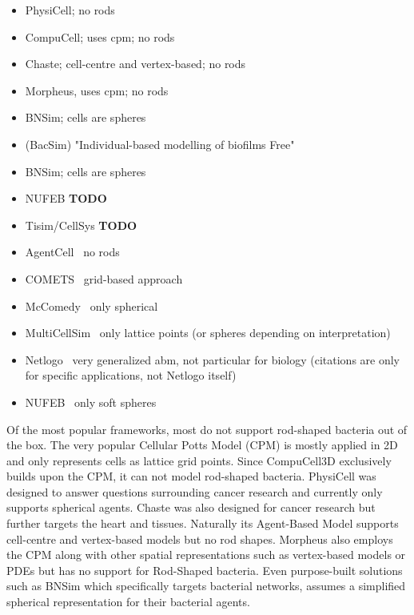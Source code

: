 \begin{itemize}
    \item \cite{Ghaffarizadeh2018} PhysiCell; no rods
    \item \cite{Swat2012} CompuCell; uses \ac{cpm}; no rods
    \item \cite{Cooper2020} Chaste; cell-centre and vertex-based; no rods
    \item \cite{Starru2014} Morpheus, uses \ac{cpm}; no rods
    \item \cite{Wei2013} BNSim; cells are spheres
    \item \cite{Kreft1998,Kreft2001,Lin2023} (BacSim) "Individual-based modelling of biofilms Free"
    \item \cite{Wei2013} BNSim; cells are spheres
    \item \cite{Li2019} NUFEB \textbf{TODO}
    \item \cite{Hoehme2010} Tisim/CellSys \textbf{TODO}
    \item AgentCell~\cite{Emonet2005} no rods
    \item COMETS~\cite{Harcombe2014} grid-based approach
    \item McComedy~\cite{Bogdanowski2022} only spherical
    \item MultiCellSim~\cite{Dang2020} only lattice points (or spheres depending on interpretation)
    \item Netlogo~\cite{Banitz2015,vanderWal2013} very generalized \ac{abm}, not particular
        for biology (citations are only for specific applications, not Netlogo itself)
    \item NUFEB~\cite{Li2019} only soft spheres
\end{itemize}

Of the most popular frameworks, most do not support rod-shaped bacteria out of the box.
The very popular Cellular Potts Model (CPM) \cite{Graner1992} is mostly applied in 2D and only
represents cells as lattice grid points.
Since CompuCell3D \cite{Swat2012} exclusively builds upon the CPM, it can not model rod-shaped
bacteria.
PhysiCell \cite{Ghaffarizadeh2018} was designed to answer questions surrounding cancer research and
currently only supports spherical agents.
Chaste \cite{Cooper2020} was also designed for cancer research but further targets the heart and
tissues.
Naturally its Agent-Based Model supports cell-centre and vertex-based models but no rod shapes.
Morpheus \cite{Starru2014} also employs the CPM along with other spatial representations such as
vertex-based models or PDEs but has no support for Rod-Shaped bacteria.
Even purpose-built solutions such as BNSim \cite{Wei2013} which specifically targets bacterial
networks, assumes a simplified spherical representation for their bacterial agents.

